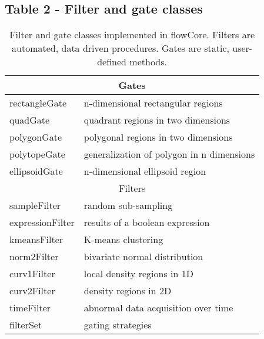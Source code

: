 \documentclass[10pt]{bmc_article}
\newcommand{\Rpackage}[1]{{\textsf{#1}}}
\newenvironment{bmcformat}{\begin{raggedright}\baselineskip20pt\sloppy\setboolean{publ}{false}}{\end{raggedright}\baselineskip20pt\sloppy}
\begin{document}
\begin{bmcformat}
  \subsection*{Table 2 - Filter and gate classes}
  \begin{table}[ht]
    \caption{\label{table2} Filter and gate classes implemented in
      \Rpackage{flowCore}. Filters are automated, data driven procedures. Gates are static, user-defined methods.} 
    \begin{center}
      \begin{tabular}{|l|l|}
        \hline
        \multicolumn{2}{|c|}{Gates} \\
        \hline
        rectangleGate & n-dimensional rectangular regions \\
        quadGate & quadrant regions in two dimensions \\
        polygonGate & polygonal regions in two dimensions \\
        polytopeGate & generalization of polygon in n dimensions \\
        ellipsoidGate & n-dimensional ellipsoid region \\
        \hline
        \multicolumn{2}{|c|}{Filters} \\
        \hline
        sampleFilter & random sub-sampling\\
        expressionFilter & results of a boolean expression \\
        kmeansFilter & K-means clustering \\
        norm2Filter & bivariate normal distribution \\
        curv1Filter & local density regions in 1D \\
        curv2Filter & density regions in 2D \\
        timeFilter & abnormal data acquisition over time \\
        \hline
        filterSet & gating strategies \\
        \hline
      \end{tabular}
    \end{center}
  \end{table}





\end{bmcformat}
\end{document}
